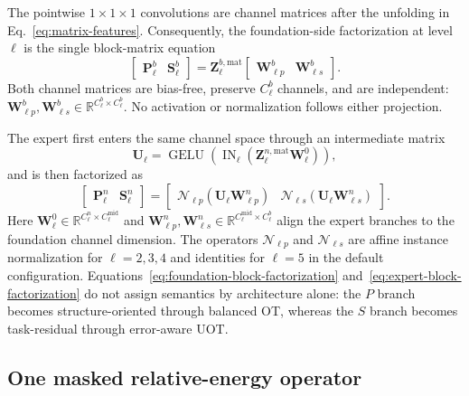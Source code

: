 \documentclass[10pt]{article}
\newcommand{\R}{\mathbb{R}}
\newcommand{\IN}{\operatorname{IN}}
\newcommand{\GELU}{\operatorname{GELU}}
\begin{document}
The pointwise $1\times1\times1$ convolutions are channel matrices after the
unfolding in Eq.~\eqref{eq:matrix-features}.  Consequently, the foundation-side
factorization at level $\ell$ is the single block-matrix equation
\begin{equation}
    \boxed{
    \begin{bmatrix}\bm P^b_\ell&\bm S^b_\ell\end{bmatrix}
    =\bm Z^{b,\mathrm{mat}}_\ell
     \begin{bmatrix}\bm W^b_{\ell p}&\bm W^b_{\ell s}\end{bmatrix}.}
    \label{eq:foundation-block-factorization}
\end{equation}
Both channel matrices are bias-free, preserve $C^b_\ell$ channels, and are
independent:
$\bm W^b_{\ell p},\bm W^b_{\ell s}\in
\R^{C^b_\ell\times C^b_\ell}$.  No activation or normalization follows either
projection.

The expert first enters the same channel space through an intermediate matrix
\begin{equation}
    \bm U_\ell
    =\GELU\!\left(\IN_\ell(\bm Z^{n,\mathrm{mat}}_\ell\bm W^0_\ell)\right),
\end{equation}
and is then factorized as
\begin{equation}
    \boxed{
    \begin{bmatrix}\bm P^n_\ell&\bm S^n_\ell\end{bmatrix}
    =\begin{bmatrix}
       \mathcal N_{\ell p}(\bm U_\ell\bm W^n_{\ell p})&
       \mathcal N_{\ell s}(\bm U_\ell\bm W^n_{\ell s})
     \end{bmatrix}.}
    \label{eq:expert-block-factorization}
\end{equation}
Here $\bm W^0_\ell\in\R^{C^n_\ell\times C^{\mathrm{mid}}_\ell}$ and
$\bm W^n_{\ell p},\bm W^n_{\ell s}
\in\R^{C^{\mathrm{mid}}_\ell\times C^b_\ell}$ align the expert branches to
the foundation channel dimension.
The operators $\mathcal N_{\ell p}$ and $\mathcal N_{\ell s}$ are affine
instance normalization for $\ell=2,3,4$ and identities for $\ell=5$ in the
default configuration.  Equations~\eqref{eq:foundation-block-factorization}
and~\eqref{eq:expert-block-factorization} do not assign semantics by
architecture alone: the $P$ branch becomes structure-oriented through balanced
OT, whereas the $S$ branch becomes task-residual through error-aware UOT.

\subsection{One masked relative-energy operator}
\end{document}

